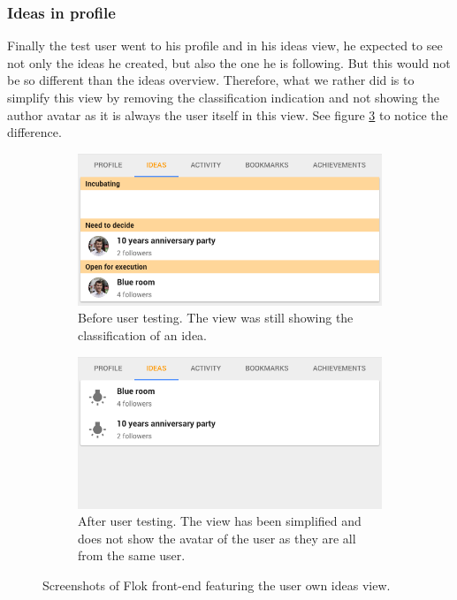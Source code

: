 \documentclass[a4paper,12pt,twoside]{article}
\begin{document}
\subsubsection*{Ideas in profile}
Finally the test user went to his profile and in his ideas view, he expected to see not only the ideas he created, but also the one he is following.
But this would not be so different than the ideas overview.
Therefore, what we rather did is to simplify this view by removing the classification indication and not showing the author avatar as it is always the user itself in this view.
See figure \ref{fig.tests.personIdeas} to notice the difference.

\begin{figure}[!htb]
    \begin{subfigure}[t]{.495\textwidth}
        \includegraphics[width=\textwidth]{images/user_tests/personIdeas_before.png}
        \caption{Before user testing. The view was still showing the classification of an idea.}
        \label{fig.tests.personIdeas.before}
    \end{subfigure}
    \hfill
    \begin{subfigure}[t]{.495\textwidth}
        \includegraphics[width=\textwidth]{images/user_tests/personIdeas_after.png}
        \caption{After user testing. The view has been simplified and does not show the avatar of the user as they are all from the same user.}
        \label{fig.tests.personIdeas.after}
    \end{subfigure}
    \caption{Screenshots of Flok front-end featuring the user own ideas view.}
    \label{fig.tests.personIdeas}
\end{figure}
\end{document}
